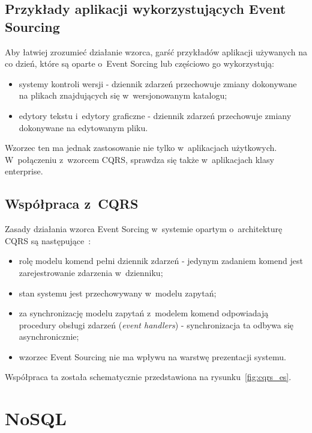 \subsection{Przykłady aplikacji wykorzystujących Event Sourcing}

Aby łatwiej zrozumieć działanie wzorca, garść przykładów aplikacji używanych na co dzień, które są oparte o~Event Sorcing lub częściowo go wykorzystują:

\begin{itemize}
 \item systemy kontroli wersji - dziennik zdarzeń przechowuje zmiany dokonywane na plikach znajdujących się w~wersjonowanym katalogu;
 \item edytory tekstu i~edytory graficzne - dziennik zdarzeń przechowuje zmiany dokonywane na edytowanym pliku.
\end{itemize}

Wzorzec ten ma jednak zastosowanie nie tylko w~aplikacjach użytkowych.
W~połączeniu z~wzorcem CQRS, sprawdza się także w~aplikacjach klasy enterprise.


\subsection{Współpraca z~CQRS}

Zasady działania wzorca Event Sorcing w~systemie opartym o~architekturę CQRS są następujące~\cite{cqrs_es}:

\begin{itemize}
 \item rolę modelu komend pełni dziennik zdarzeń - jedynym zadaniem komend jest zarejestrowanie zdarzenia w~dzienniku;
 \item stan systemu jest przechowywany w~modelu zapytań;
 \item za synchronizację modelu zapytań z~modelem komend odpowiadają procedury obsługi zdarzeń (\emph{event handlers}) - synchronizacja ta odbywa się asynchronicznie;
 \item wzorzec Event Sourcing nie ma wpływu na warstwę prezentacji systemu.
\end{itemize}


Współpraca ta została schematycznie przedstawiona na rysunku~\ref{fig:cqrs_es}.





\section{NoSQL}

